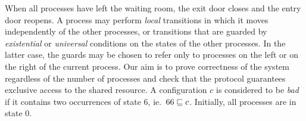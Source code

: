 %
When all processes have left the waiting room, the exit door closes
and the entry door reopens.
%
A process may perform {\it local} transitions in which
it moves independently of the other processes,
or transitions that are guarded by {\it existential} or 
{\it universal} conditions on the states of the other processes. 
%
In the latter case, the guards may be chosen to refer only to
processes on the left or on the right of the current process.
%
Our aim is to prove correctness of the system regardless of the number
of processes and check that the protocol guarantees exclusive access
to the shared resource. A configuration $c$ is considered to be
\emph{bad} if it contains two occurrences of state $6$, ie.\
$66\sqsubseteq c$. Initially, all processes are in state $0$.
